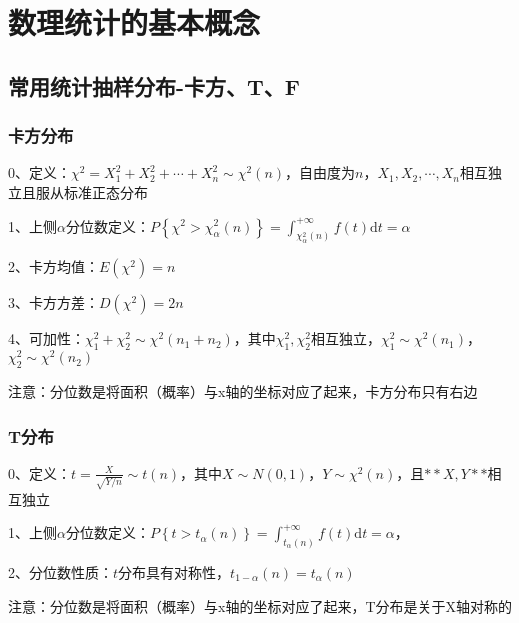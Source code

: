 \chapter{数理统计的基本概念}

\section{常用统计抽样分布-卡方、T、F}



\subsection{卡方分布}

0、定义：$ \chi^{2} = X_1^2+X_2^2+\cdots+X_n^2 \sim \chi^{2}(n) $，自由度为$ n $，$ X_1,X_2,\cdots ,X_n $相互独立且服从标准正态分布

1、上侧$ \alpha $分位数定义：$ P\left\{\chi^{2}>\chi_{\alpha}^{2}(n)\right\}=\int_{\chi_{\alpha}^{2}(n)}^{+\infty} f(t) \mathrm{d} t=\alpha $

2、卡方均值：$ E\left(\chi^{2}\right)=n $

3、卡方方差：$ D\left(\chi^{2}\right)=2 n $

4、可加性：$ \chi_{1}^{2}+\chi_{2}^{2} \sim \chi^{2}\left(n_{1}+n_{2}\right) $，其中$ \chi_{1}^{2}, \chi_{2}^{2} $相互独立，$ \chi_{1}^{2} \sim \chi^{2}\left(n_{1}\right) $，$ \chi_{2}^{2} \sim \chi^{2}\left(n_{2}\right) $

注意：分位数是将面积（概率）与x轴的坐标对应了起来，卡方分布只有右边



\subsection{T分布}

0、定义：$ t=\frac{X}{\sqrt{Y/n}} \sim t(n) $，其中$ X \sim N(0,1) $，$ Y\sim \chi^{2}\left(n\right) $，且$ **X,Y** $相互独立

1、上侧$ \alpha $分位数定义：$ P\left\{t>t_{\alpha}(n)\right\}=\int_{t_{\alpha}(n)}^{+\infty} f(t) \mathrm{d} t=\alpha $，

2、分位数性质：$ t $分布具有对称性，$ t_{1-\alpha}(n)=t_{\alpha}(n) $

注意：分位数是将面积（概率）与x轴的坐标对应了起来，T分布是关于X轴对称的



